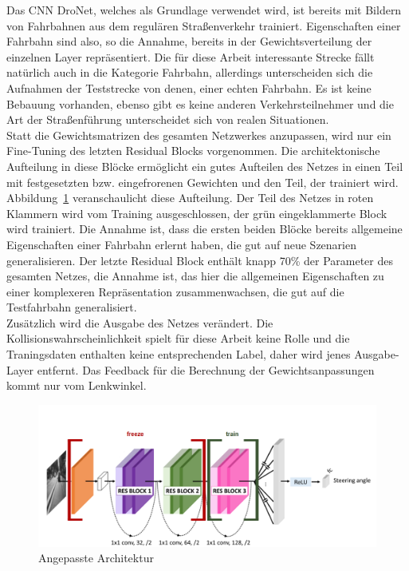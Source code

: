 Das CNN DroNet, welches als Grundlage verwendet wird, ist bereits mit Bildern von Fahrbahnen aus dem regulären Straßenverkehr trainiert. Eigenschaften einer Fahrbahn sind also, so die Annahme, bereits in der Gewichtsverteilung der einzelnen Layer repräsentiert. Die für diese Arbeit interessante Strecke fällt natürlich auch in die Kategorie Fahrbahn, allerdings unterscheiden sich die Aufnahmen der Teststrecke von denen, einer echten Fahrbahn. Es ist keine Bebauung vorhanden, ebenso gibt es keine anderen Verkehrsteilnehmer und die Art der Straßenführung unterscheidet sich von realen Situationen.\\
Statt die Gewichtsmatrizen des gesamten Netzwerkes anzupassen, wird nur ein Fine-Tuning des letzten Residual Blocks vorgenommen. Die architektonische Aufteilung in diese Blöcke ermöglicht ein gutes Aufteilen des Netzes in einen Teil mit festgesetzten bzw. eingefrorenen Gewichten und den Teil, der trainiert wird.\\
Abbildung~\ref{img:dronetfrozen} veranschaulicht diese Aufteilung. Der Teil des Netzes in roten Klammern wird vom Training ausgeschlossen, der grün eingeklammerte Block wird trainiert. Die Annahme ist, dass die ersten beiden Blöcke bereits allgemeine Eigenschaften einer Fahrbahn erlernt haben, die gut auf neue Szenarien generalisieren. Der letzte Residual Block enthält knapp 70\% der Parameter des gesamten Netzes, die Annahme ist, das hier die allgemeinen Eigenschaften zu einer komplexeren Repräsentation zusammenwachsen, die gut auf die Testfahrbahn generalisiert.\\
Zusätzlich wird die Ausgabe des Netzes verändert. Die Kollisionswahrscheinlichkeit spielt für diese Arbeit keine Rolle und die Traningsdaten enthalten keine entsprechenden Label, daher wird jenes Ausgabe-Layer entfernt. Das Feedback für die Berechnung der Gewichtsanpassungen kommt nur vom Lenkwinkel.

\begin{figure}[h]
	\centering
	\includegraphics[scale=0.5]{figures/Architecture-DRONET-FROZEN.png}
	\caption{Angepasste Architektur}
	\label{img:dronetfrozen}
\end{figure}




